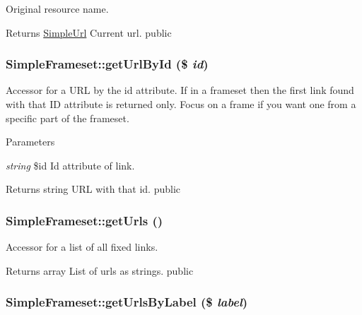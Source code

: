 \label{class_simple_frameset_a4126babe4b4451217db33c9f018a5ca3}
Original resource name. \begin{DoxyReturn}{Returns}
\hyperlink{class_simple_url}{SimpleUrl} Current url.  public 
\end{DoxyReturn}
\hypertarget{class_simple_frameset_a68a27626e377cbbba7c12ae3a8f14ca1}{
\subsubsection[{getUrlById}]{\setlength{\rightskip}{0pt plus 5cm}SimpleFrameset::getUrlById (\$ {\em id})}}
\label{class_simple_frameset_a68a27626e377cbbba7c12ae3a8f14ca1}
Accessor for a URL by the id attribute. If in a frameset then the first link found with that ID attribute is returned only. Focus on a frame if you want one from a specific part of the frameset. 
\begin{DoxyParams}{Parameters}
\item[{\em string}]\$id Id attribute of link. \end{DoxyParams}
\begin{DoxyReturn}{Returns}
string URL with that id.  public 
\end{DoxyReturn}
\hypertarget{class_simple_frameset_a8d6ecab50471cf5107cb71ec07c7d48f}{
\subsubsection[{getUrls}]{\setlength{\rightskip}{0pt plus 5cm}SimpleFrameset::getUrls ()}}
\label{class_simple_frameset_a8d6ecab50471cf5107cb71ec07c7d48f}
Accessor for a list of all fixed links. \begin{DoxyReturn}{Returns}
array List of urls as strings.  public 
\end{DoxyReturn}
\hypertarget{class_simple_frameset_a3a9ca9ce795e358526fee6138b435d85}{
\subsubsection[{getUrlsByLabel}]{\setlength{\rightskip}{0pt plus 5cm}SimpleFrameset::getUrlsByLabel (\$ {\em label})}}
\label{class_simple_frameset_a3a9ca9ce795e358526fee6138b435d85}
